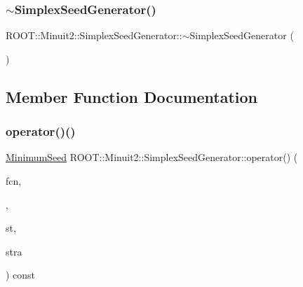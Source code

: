 \subsubsection{\texorpdfstring{$\sim$SimplexSeedGenerator()}{~SimplexSeedGenerator()}\hspace{0.1cm}{\footnotesize\ttfamily [3/3]}}
{\footnotesize\ttfamily R\+O\+O\+T\+::\+Minuit2\+::\+Simplex\+Seed\+Generator\+::$\sim$\+Simplex\+Seed\+Generator (\begin{DoxyParamCaption}{ }\end{DoxyParamCaption})\hspace{0.3cm}{\ttfamily [inline]}}



\subsection{Member Function Documentation}
\mbox{\label{classROOT_1_1Minuit2_1_1SimplexSeedGenerator_aa0c427acb85f9a47a0abaecbf85b1f5c}} 
\subsubsection{\texorpdfstring{operator()()}{operator()()}\hspace{0.1cm}{\footnotesize\ttfamily [1/6]}}
{\footnotesize\ttfamily \mbox{\hyperlink{classROOT_1_1Minuit2_1_1MinimumSeed}{Minimum\+Seed}} R\+O\+O\+T\+::\+Minuit2\+::\+Simplex\+Seed\+Generator\+::operator() (\begin{DoxyParamCaption}\item[{const \mbox{\hyperlink{classROOT_1_1Minuit2_1_1MnFcn}{Mn\+Fcn}} \&}]{fcn,  }\item[{const \mbox{\hyperlink{classROOT_1_1Minuit2_1_1GradientCalculator}{Gradient\+Calculator}} \&}]{,  }\item[{const \mbox{\hyperlink{classROOT_1_1Minuit2_1_1MnUserParameterState}{Mn\+User\+Parameter\+State}} \&}]{st,  }\item[{const \mbox{\hyperlink{classROOT_1_1Minuit2_1_1MnStrategy}{Mn\+Strategy}} \&}]{stra }\end{DoxyParamCaption}) const\hspace{0.3cm}{\ttfamily [virtual]}}



